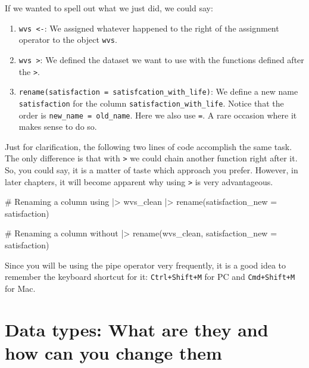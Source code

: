 \documentclass[
  letterpaper,
]{krantz}
\makeatletter
\newenvironment{Shaded}{\begin{snugshade}}{\end{snugshade}}
\newcommand{\AttributeTok}[1]{\textcolor[rgb]{0.40,0.45,0.13}{#1}}
\newcommand{\CommentTok}[1]{\textcolor[rgb]{0.37,0.37,0.37}{#1}}
\newcommand{\FunctionTok}[1]{\textcolor[rgb]{0.28,0.35,0.67}{#1}}
\newcommand{\NormalTok}[1]{\textcolor[rgb]{0.00,0.23,0.31}{#1}}
\newcommand{\SpecialCharTok}[1]{\textcolor[rgb]{0.37,0.37,0.37}{#1}}
\newenvironment{kframe}{%
\medskip{}
\setlength{\fboxsep}{.8em}
 \def\at@end@of@kframe{}%
 \ifinner\ifhmode%
  \def\at@end@of@kframe{\end{minipage}}%
  \begin{minipage}{\columnwidth}%
 \fi\fi%
 \def\FrameCommand##1{\hskip\@totalleftmargin \hskip-\fboxsep
 \colorbox{shadecolor}{##1}\hskip-\fboxsep
     \hskip-\linewidth \hskip-\@totalleftmargin \hskip\columnwidth}%
 \MakeFramed {\advance\hsize-\width
   \@totalleftmargin\z@ \linewidth\hsize
   \@setminipage}}%
 {\par\unskip\endMakeFramed%
 \at@end@of@kframe}
\renewenvironment{Shaded}{\begin{kframe}}{\end{kframe}}
\makeatother
\begin{document}
If we wanted to spell out what we just did, we could say:

\begin{enumerate}
\def\labelenumi{\arabic{enumi}.}
\item
  \texttt{wvs\ \textless{}-}: We assigned whatever happened to the right
  of the assignment operator to the object \texttt{wvs}.
\item
  \texttt{wvs\ \textbar{}\textgreater{}}: We defined the dataset we want
  to use with the functions defined after the
  \texttt{\textbar{}\textgreater{}}.
\item
  \texttt{rename(satisfaction\ =\ satisfcation\_with\_life)}: We define
  a new name \texttt{satisfaction} for the column
  \texttt{satisfaction\_with\_life}. Notice that the order is
  \texttt{new\_name\ =\ old\_name}. Here we also use \texttt{=}. A rare
  occasion where it makes sense to do so.
\end{enumerate}

Just for clarification, the following two lines of code accomplish the
same task. The only difference is that with
\texttt{\textbar{}\textgreater{}} we could chain another function right
after it. So, you could say, it is a matter of taste which approach you
prefer. However, in later chapters, it will become apparent why using
\texttt{\textbar{}\textgreater{}} is very advantageous.

\begin{Shaded}
\begin{Highlighting}[]
\CommentTok{\# Renaming a column using \textquotesingle{}|\textgreater{}\textquotesingle{}}
\NormalTok{wvs\_clean }\SpecialCharTok{|\textgreater{}} \FunctionTok{rename}\NormalTok{(}\AttributeTok{satisfaction\_new =}\NormalTok{ satisfaction)}

\CommentTok{\# Renaming a column without \textquotesingle{}|\textgreater{}\textquotesingle{}}
\FunctionTok{rename}\NormalTok{(wvs\_clean, }\AttributeTok{satisfaction\_new =}\NormalTok{ satisfaction)}
\end{Highlighting}
\end{Shaded}

Since you will be using the pipe operator very frequently, it is a good
idea to remember the keyboard shortcut for it: \texttt{Ctrl+Shift+M} for
PC and \texttt{Cmd+Shift+M} for Mac.

\section{Data types: What are they and how can you change
them}\label{sec-change-data-types}
\end{document}
